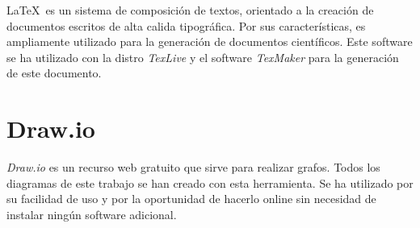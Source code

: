 \LaTeX \, es un sistema de composición de textos, orientado a la creación de documentos escritos de alta calida tipográfica. Por sus características, es ampliamente utilizado para la generación de documentos científicos. Este software se ha utilizado con la distro \textit{TexLive} y el software \textit{TexMaker} para la generación de este documento.\\

\section{Draw.io}

\textit{Draw.io} es un recurso web gratuito que sirve para realizar grafos. Todos los diagramas de este trabajo se han creado con esta herramienta. Se ha utilizado por su facilidad de uso y por la oportunidad de hacerlo online sin necesidad de instalar ningún software adicional.\\

